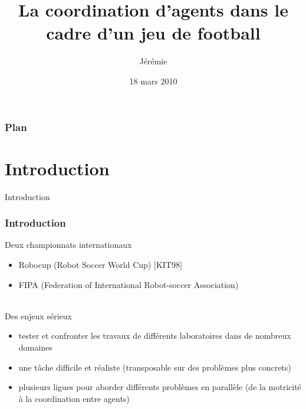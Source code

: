 \documentclass{beamer}
\title{La coordination d'agents dans le cadre d'un jeu de football}
\author{Jérémie \bsc{Decock}}
\institute{UPMC}
\date{18 mars 2010}
\begin{document}
\begin{frame}
\titlepage
\end{frame}


\begin{frame}
\frametitle{Plan}
\tableofcontents[sectionstyle=show/show,subsectionstyle=hide/hide/hide]
\end{frame}


\section{Introduction}
\begin{frame}
\begin{center}
{\LARGE Introduction}
\end{center}
\end{frame}


\begin{frame}
\frametitle{Introduction}
Deux championnats internationaux
\begin{itemize}
	\item Robocup (Robot Soccer World Cup) $[$KIT98$]$
	\item FIPA (Federation of International Robot-soccer Association)
\end{itemize}
~\\
Des enjeux sérieux
\begin{itemize}
	\item tester et confronter les travaux de différents laboratoires dans de nombreux domaines
    \item une tâche difficile et réaliste (transposable sur des problèmes plus concrets)
    \item plusieurs ligues pour aborder différents problèmes en parallèle (de la motricité à la coordination entre agents)
\end{itemize}
\end{frame}
\end{document}
